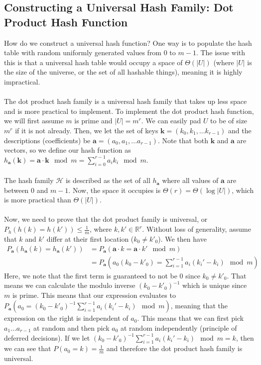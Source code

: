 \documentclass{article}
\begin{document}
\subsection*{Constructing a Universal Hash Family: Dot Product Hash Function}
How do we construct a universal hash function? One way is to populate the hash table with random uniformly generated values from $0$ to $m-1$. The issue with this is that a universal hash table would occupy a space of $\Theta(|U|)$ (where $|U|$ is the size of the universe, or the set of all hashable things), meaning it is highly impractical.\\
\\
The dot product hash family is a universal hash family that takes up less space and is more practical to implement. To implement the dot product hash function, we will first assume $m$ is prime and $|U| = m^r$. We can easily pad $U$ to be of size $m^r$ if it is not already. Then, we let the set of keys $\mathbf{k} = (k_0, k_1, ... k_{r-1})$ and the descriptions (coefficients) be $\mathbf{a} = (a_0, a_1, ... a_{r-1})$. Note that both $\mathbf{k}$ and $\mathbf{a}$ are vectors, so we define our hash function as $h_{\mathbf{a}} (\mathbf{k}) = \mathbf{a} \cdot \mathbf{k} \mod m = \sum_{i=0}^{r-1} a_i k_i \mod m$.\\
\\
The hash family $\mathcal{H}$ is described as the set of all $h_{\mathbf{a}}$ where all values of $\mathbf{a}$ are between 0 and $m-1$. Now, the space it occupies is $\Theta(r) = \Theta(\log |U|)$, which is more practical than $\Theta(|U|)$.\\
\\
Now, we need to prove that the dot product family is universal, or $P_h(h(k) = h(k')) \leq \frac{1}{m}$, where $k, k' \in \mathbb{R}^r$. Without loss of generality, assume that $k$ and $k'$ differ at their first location ($k_0 \neq k'_0$). We then have
\begin{align*}
    P_\mathbf{a}(h_\mathbf{a}(k) = h_\mathbf{a} (k')) &= P_\mathbf{a} (\mathbf{a} \cdot k = \mathbf{a} \cdot k' \mod m)\\
    &= P_\mathbf{a} (a_0 (k_0 - k'_0) = \sum_{i=1}^{r-1} a_i (k_i' - k_i) \mod m)
\end{align*}
Here, we note that the first term is guaranteed to not be 0 since $k_0 \neq k'_0$. That means we can calculate the modulo inverse $(k_0 - k'_0)^{-1}$ which is unique since $m$ is prime. This means that our expression evaluates to $P_\mathbf{a} (a_0 = (k_0 - k'_0)^{-1} \sum_{i=1}^{r-1} a_i (k_i' - k_i) \mod m)$, meaning that the expression on the right is independent of $a_0$. This means that we can first pick $a_1 ... a_{r-1}$ at random and then pick $a_0$ at random independently (principle of deferred decisions). If we let $(k_0 - k'_0)^{-1} \sum_{i=1}^{r-1} a_i (k_i' - k_i) \mod m = k$, then we can see that $P(a_0 = k) = \frac{1}{m}$ and therefore the dot product hash family is universal.
\end{document}
